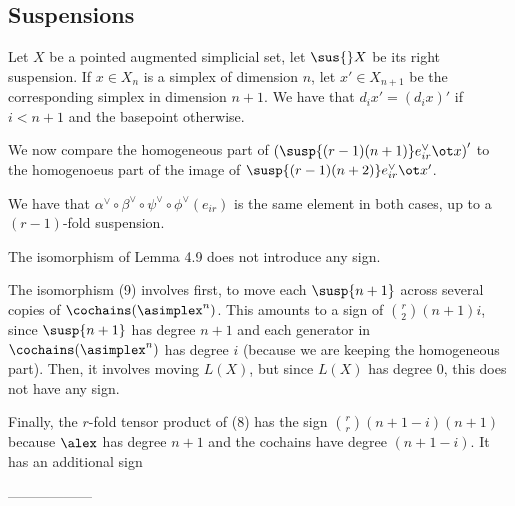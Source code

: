 
\subsection{Suspensions} Let $X$ be a pointed augmented simplicial set, let $\sus{}X$ be its right suspension. If $x\in X_n$ is a simplex of dimension $n$, let $x'\in X_{n+1}$ be the corresponding simplex in dimension $n+1$. We have that $d_ix' = (d_ix)'$ if $i<n+1$ and the basepoint otherwise.

We now compare the homogeneous part of $\left(\susp{(r-1)(n+1)}e_{ir}^\vee\ot x\right)'$ to the homogenoeus part of the image of $\susp{(r-1)(n+2)}e_{ir}^\vee\ot x'$.

We have that $\alpha^\vee\circ \beta^\vee \circ \psi^\vee\circ \phi^\vee(e_{ir})$ is the same element in both cases, up to a $(r-1)$-fold suspension.

The isomorphism of Lemma 4.9 does not introduce any sign.

The isomorphism (9) involves first, to move each $\susp{n+1}$ across several copies of $\cochains(\asimplex^{n})$. This amounts to a sign of $\binom{r}{2}(n+1)i$, since $\susp{n+1}$ has degree $n+1$ and each generator in $\cochains(\asimplex^{n})$ has degree $i$ (because we are keeping the homogeneous part). Then, it involves moving $L(X)$, but since $L(X)$ has degree $0$, this does not have any sign.

Finally, the $r$-fold tensor product of (8) has the sign $\binom{r}{r}(n+1-i)(n+1)$ because $\alex$ has degree $n+1$ and the cochains have degree $(n+1-i)$. It has an additional sign 

------------------

